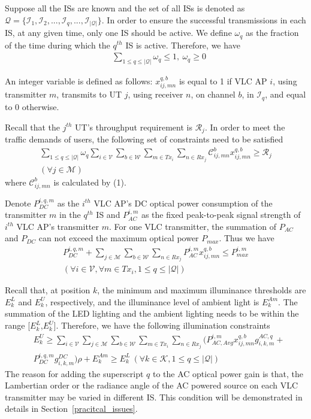 \documentclass[10pt,journal]{IEEEtran}
\begin{document}
Suppose all the ISs are known and the set of all ISs is denoted as $\mathcal{Q}=\{\mathcal{I}_{1},\mathcal{I}_{2},...,\mathcal{I}_{q},...,\mathcal{I}_{|\mathcal{Q}|}\}$. In order to ensure the successful transmissions in each IS, at any given time, only one IS should be active. We define $\omega_{q}$ as the fraction of the time during which the $q^{th}$ IS is active. Therefore, we have
\begin{align}
&\sum_{1\leq q\leq|\mathcal{Q}|}\omega_{q}\leq 1,~\omega_{q}\geq 0
\end{align}

An integer variable is defined as follows: $x_{ij,mn}^{q,b}$ is equal to 1 if VLC AP $i$, using transmitter $m$, transmits to UT $j$, using receiver $n$, on channel $b$, in $\mathcal{I}_{q}$, and equal to 0 otherwise.

Recall that the $j^{th}$ UT's throughput requirement is $\mathcal{R}_{j}$. In order to meet the traffic demands of users, the following set of constraints need to be satisfied
\begin{align}
\sum_{1\leq q\leq|\mathcal{Q}|}\omega_{q}\sum_{i\in\mathcal{V}}\sum_{b\in\mathcal{W}}\sum_{m\in Tx_{i}}\sum_{n\in Rx_{j}}\mathcal{C}_{ij,mn}^{b}x_{ij,mn}^{q,b}\geq \mathcal{R}_{j}\nonumber\\
(\forall j\in\mathcal{M})
\end{align}
where $\mathcal{C}_{ij,mn}^{b}$ is calculated by (1).

Denote $P_{DC}^{i,q,m}$ as the $i^{th}$ VLC AP's DC optical power consumption of the transmitter $m$ in the $q^{th}$ IS and $P_{AC}^{i,m}$ as the fixed peak-to-peak signal strength of $i^{th}$ VLC AP's transmitter $m$. For one VLC transmitter, the summation of $P_{AC}$ and $P_{DC}$ can not exceed the maximum optical power $P_{max}$. Thus we have
\begin{align}
P_{DC}^{i,q,m}+\sum_{j\in\mathcal{M}}\sum_{b\in\mathcal{W}}\sum_{n\in Rx_{j}}P_{AC}^{i,m}x_{ij,mn}^{q,b}\leq P_{max}^{i,m}\nonumber\\
(\forall i\in\mathcal{V}, \forall m\in Tx_{i}, 1\leq q\leq|\mathcal{Q}|)
\end{align}

Recall that, at position $k$, the minimum and maximum illuminance thresholds are $E_{k}^{L}$ and $E_{k}^{U}$, respectively, and the illuminance level of ambient light is $E_{k}^{Am}$. The summation of the LED lighting and the ambient lighting needs to be within the range [$E_{k}^{L}$,$E_{k}^{U}$]. Therefore, we have the following illumination constraints
\begin{align}
&E_{k}^{U}\geq\sum_{i\in\mathcal{V}}\sum_{j\in\mathcal{M}}\sum_{b\in\mathcal{W}}\sum_{m\in Tx_{i}}\sum_{n\in Rx_{j}}(P_{AC,Avg}^{i,m}x_{ij,mn}^{q,b}g_{i,k,m}^{AC,q}+\nonumber\\
&P_{DC}^{i,q,m}g_{i,k,m}^{DC})\rho+E_{k}^{Am}\geq E_{k}^{L}~(\forall k\in\mathcal{K}, 1\leq q\leq|\mathcal{Q}|)
\end{align}
The reason for adding the superscript $q$ to the AC optical power gain is that, the Lambertian order or the radiance angle of the AC powered source on each VLC transmitter may be varied in different IS. This condition will be demonstrated in details in Section~\ref{pracitcal_issues}.
\end{document}
